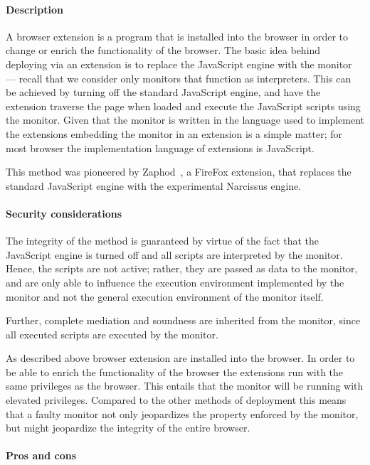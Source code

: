 \documentclass{llncs}
\begin{document}
\paragraph{Description}

A browser extension is a program that is installed into the browser in order to
change or enrich the functionality of the browser.  The basic idea behind
deploying via an extension is to replace the JavaScript engine with the monitor
--- recall that we consider only monitors that function as interpreters.
%
This can be achieved by turning off the standard JavaScript engine, and have
the extension traverse the page when loaded and execute the JavaScript scripts
using the monitor. 
%
Given that the monitor is written in the language used to implement the extensions
embedding the monitor in an extension is a simple matter; for most browser
the implementation language of extensions is JavaScript.

This method was pioneered by Zaphod~\cite{Zaphod}, a
FireFox extension, that replaces the standard JavaScript engine with the
experimental Narcissus engine.

\paragraph{Security considerations}

The integrity of the method is guaranteed by virtue of the fact that the
JavaScript engine is turned off and all scripts are interpreted by the monitor.
Hence, the scripts are not active; rather, they are passed as data to the
monitor, and are only able to influence the execution environment implemented
by the monitor and not the general execution environment of the monitor itself.

Further, complete mediation and soundness are inherited from the monitor, since
all executed scripts are executed by the monitor.


As described above browser extension are installed into the browser. In order
to be able to enrich the functionality of the browser the extensions run with
the same privileges as the browser. This entails that the monitor will be
running with elevated privileges.  Compared to the other methods of deployment
this means that a faulty monitor not only jeopardizes the property enforced by
the monitor, but might jeopardize the integrity of the entire browser.

\paragraph{Pros and cons}
\end{document}
